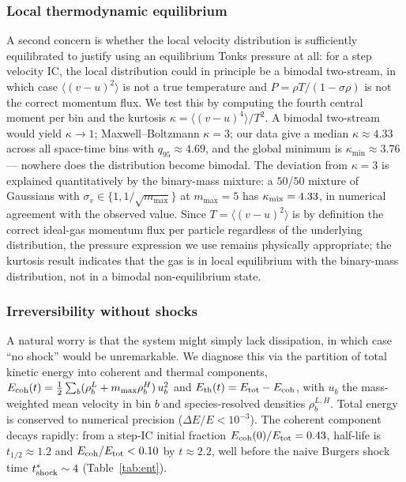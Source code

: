 \documentclass[aps,pre,twocolumn,superscriptaddress,longbibliography,floatfix]{revtex4-2}
\begin{document}
\subsubsection*{Local thermodynamic equilibrium}

A second concern is whether the local velocity distribution is
sufficiently equilibrated to justify using an equilibrium Tonks
pressure at all: for a step velocity IC, the local distribution
could in principle be a bimodal two-stream, in which case
$\langle (v-u)^2\rangle$ is not a true temperature and
$P=\rho T/(1-\sigma\rho)$ is not the correct momentum flux. We
test this by computing the fourth central moment per bin and
the kurtosis $\kappa = \langle(v-u)^4\rangle/T^2$. A bimodal
two-stream would yield $\kappa\to 1$; Maxwell--Boltzmann
$\kappa = 3$; our data give a median $\kappa\approx 4.33$ across
all space-time bins with $q_{95}\approx 4.69$, and the global
minimum is $\kappa_{\min}\approx 3.76$ --- nowhere does the
distribution become bimodal. The deviation from
$\kappa = 3$ is explained quantitatively by the binary-mass
mixture: a $50$/$50$ mixture of Gaussians with
$\sigma_v\in\{1,1/\sqrt{m_{\max}}\}$ at $m_{\max}=5$ has
$\kappa_{\rm mix} = 4.33$, in numerical agreement with the
observed value. Since $T=\langle(v-u)^2\rangle$ is by definition
the correct ideal-gas momentum flux per particle regardless of
the underlying distribution, the pressure expression we use
remains physically appropriate; the kurtosis result indicates
that the gas is in local equilibrium with the binary-mass
distribution, not in a bimodal non-equilibrium state.

\subsubsection*{Irreversibility without shocks}

A natural worry is that the system might simply lack
dissipation, in which case ``no shock'' would be unremarkable.
We diagnose this via the partition of total kinetic energy
into coherent and thermal components,
$E_{\rm coh}(t) = \tfrac12\sum_b (\rho_b^L + m_{\max}\rho_b^H)\,
u_b^2$
and
$E_{\rm th}(t) = E_{\rm tot}-E_{\rm coh}$, with $u_b$ the
mass-weighted mean velocity in bin $b$ and species-resolved
densities $\rho_b^{L,H}$. Total energy is conserved to numerical
precision ($\Delta E/E < 10^{-3}$). The coherent component
decays rapidly: from a step-IC initial fraction
$E_{\rm coh}(0)/E_{\rm tot}=0.43$, half-life is
$t_{1/2}\approx 1.2$ and $E_{\rm coh}/E_{\rm tot}<0.10$ by
$t\approx 2.2$, well before the naive Burgers shock time
$t^*_{\rm shock}\sim 4$ (Table~\ref{tab:ent}).
\end{document}
